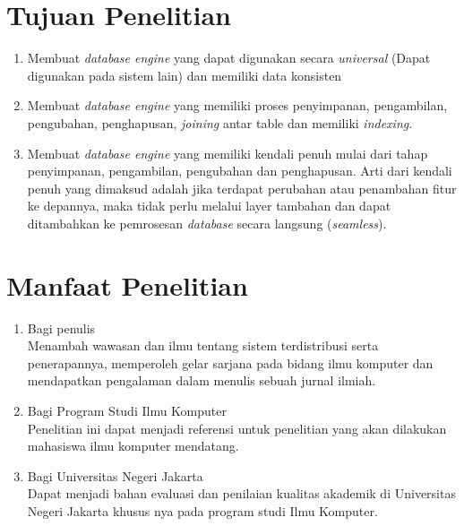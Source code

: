 \section{Tujuan Penelitian}
\begin{enumerate}
	\item{
		Membuat \emph{database engine} yang dapat digunakan secara \emph{universal} (Dapat digunakan pada sistem lain) dan memiliki data konsisten
	}
	\item{
		Membuat \emph{database engine} yang memiliki proses penyimpanan, pengambilan, pengubahan, penghapusan, \emph{joining} antar table dan memiliki \emph{indexing}.
	}
	\item{
		Membuat \emph{database engine} yang memiliki kendali penuh mulai dari tahap penyimpanan, pengambilan, pengubahan dan penghapusan. 
		Arti dari kendali penuh yang dimaksud adalah jika terdapat perubahan atau penambahan fitur ke depannya, maka tidak perlu melalui
		layer tambahan dan dapat ditambahkan ke pemrosesan \emph{database} secara langsung (\emph{seamless}).
	}
\end{enumerate}

\section{Manfaat Penelitian}
\begin{enumerate}
	\item Bagi penulis \\
	Menambah wawasan dan ilmu tentang sistem terdistribusi serta penerapannya, 
	memperoleh gelar sarjana pada bidang ilmu komputer dan mendapatkan pengalaman 
	dalam menulis sebuah jurnal ilmiah.
		
	\item Bagi Program Studi Ilmu Komputer \\
	Penelitian ini dapat menjadi referensi untuk penelitian yang akan dilakukan 
	mahasiswa ilmu komputer mendatang.


	\item Bagi Universitas Negeri Jakarta \\
	Dapat menjadi bahan evaluasi dan penilaian kualitas akademik di Universitas 
	Negeri Jakarta khusus nya pada program studi Ilmu Komputer.
			
\end{enumerate}

